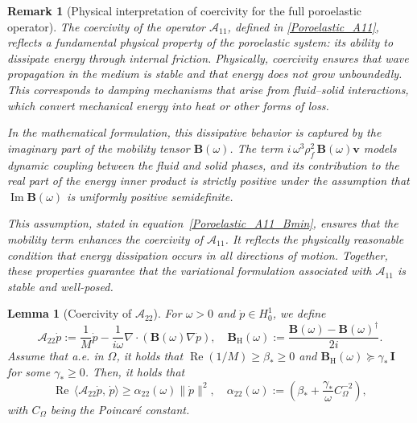 \documentclass[pdflatex,sn-mathphys-num]{sn-jnl}
\theoremstyle{thmstyleone}%
\theoremstyle{thmstyletwo}%
\newtheorem{remark}{Remark}%
\theoremstyle{thmstylethree}%
\def \om {\omega}
\def \calA {\mathcal{A}}
\newtheorem{lemma}[theorem]{Lemma}
\theoremstyle{definition}
\begin{document}
	
	
	\begin{remark}[Physical interpretation of coercivity for the full poroelastic operator]
		The coercivity of the operator \( \calA_{11} \), defined in \eqref{Poroelastic_A11}, reflects a fundamental physical property of the poroelastic system: its ability to dissipate energy through internal friction. Physically, coercivity ensures that wave propagation in the medium is stable and that energy does not grow unboundedly. This corresponds to damping mechanisms that arise from fluid–solid interactions, which convert mechanical energy into heat or other forms of loss.
		
		In the mathematical formulation, this dissipative behavior is captured by the imaginary part of the mobility tensor \( \mathbf{B}(\omega) \). The term \( i\,\omega^3 \rho_f^2\,\mathbf{B}(\omega)\mathbf{v} \) models dynamic coupling between the fluid and solid phases, and its contribution to the real part of the energy inner product is strictly positive under the assumption that \( \operatorname{Im}\mathbf{B}(\omega) \) is uniformly positive semidefinite.
		
		This assumption, stated in equation~\eqref{Poroelastic_A11_Bmin}, ensures that the mobility term enhances the coercivity of \( \calA_{11} \). It reflects the physically reasonable condition that energy dissipation occurs in all directions of motion. Together, these properties guarantee that the variational formulation associated with \( \calA_{11} \) is stable and well-posed.
	\end{remark}
	
	\begin{lemma}[Coercivity of $\mathcal{A}_{22}$]
		
		For $\omega > 0$ and $\dot p \in H^1_0$, we define
		\[
		\mathcal{A}_{22}\dot p := \frac{1}{M}\dot p - \frac{1}{i\omega}\nabla\cdot(\mathbf{B}(\omega)\nabla\dot p), \quad
		\mathbf{B}_\mathrm{H}(\omega) := \frac{\mathbf{B}(\omega) - \mathbf{B}(\omega)^\dagger}{2i}.
		\]
		Assume that a.e. in $\Omega$, it holds that $\operatorname{Re}(1/M) \ge \beta_* \ge 0$ and $\mathbf{B}_\mathrm{H}(\omega) \succeq \gamma_*\,\mathbf{I}$ for some $\gamma_* \ge 0$. 
		Then, it holds that
		\[
		\operatorname{Re}\,\langle \mathcal{A}_{22}\dot p,\,\dot p\rangle
		\ge \alpha_{22}(\om)\|\dot p\|^2, \quad \alpha_{22}(\om):=\left(\beta_*+\frac{\gamma_*}{\omega}C_{\Omega}^{-2}\right), 
		\]
		with $C_{\Omega}$ being the Poincar\'e constant.
	\end{lemma}
	
\end{document}
